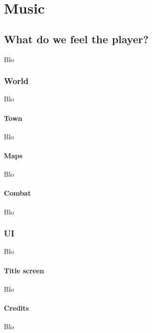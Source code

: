 \documentclass[a4paper,12pt]{book}
\begin{document}
\part{Music}
\chapter{What do we feel the player?}
Blo
\section{World}
Blo
\subsection{Town}
Blo
\subsection{Maps}
Blo
\subsection{Combat}
Blo
\section{UI}
Blo
\subsection{Title screen}
Blo
\subsection{Credits}
Blo
\end{document}
